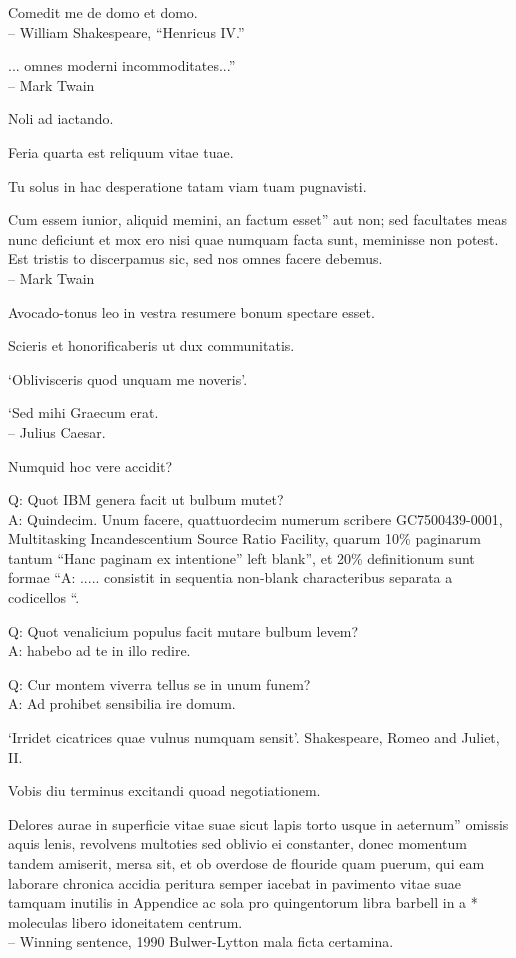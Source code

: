 \documentclass[titlepage,12pt]{memoir}
\begin{document}
Comedit me de domo et domo.
\\-- William Shakespeare, “Henricus IV.”

... omnes moderni incommoditates...”
\\-- Mark Twain

Noli ad iactando.

Feria quarta est reliquum vitae tuae.

Tu solus in hac desperatione tatam viam tuam pugnavisti.

Cum essem iunior, aliquid memini, an factum esset”
aut non; sed facultates meas nunc deficiunt et mox ero
nisi quae numquam facta sunt, meminisse non potest. Est tristis to
discerpamus sic, sed nos omnes facere debemus.
\\-- Mark Twain

Avocado-tonus leo in vestra resumere bonum spectare esset.

 Scieris et honorificaberis ut dux communitatis.

‘Oblivisceris quod unquam me noveris’.

‘Sed mihi Graecum erat.
\\-- Julius Caesar.

Numquid hoc vere accidit?

Q: Quot IBM genera facit ut bulbum mutet?\\
A: Quindecim. Unum facere, quattuordecim numerum scribere
GC7500439-0001, Multitasking Incandescentium Source Ratio Facility,
quarum 10\% paginarum tantum “Hanc paginam ex intentione”
left blank”, et 20\% definitionum sunt formae “A: .....
consistit in sequentia non-blank characteribus separata a codicellos “.

Q: Quot venalicium populus facit mutare bulbum levem?\\
A: habebo ad te in illo redire.

Q: Cur montem viverra tellus se in unum funem?\\
A: Ad prohibet sensibilia ire domum.

‘Irridet cicatrices quae vulnus numquam sensit’.
Shakespeare, Romeo and Juliet, II.

Vobis diu terminus excitandi quoad negotiationem.

Delores aurae in superficie vitae suae sicut lapis torto usque in aeternum”
omissis aquis lenis, revolvens multoties sed oblivio
ei constanter, donec momentum tandem amiserit, mersa sit, et ob
overdose de flouride quam puerum, qui eam laborare chronica
accidia peritura semper iacebat in pavimento vitae suae tamquam inutilis
in Appendice ac sola pro quingentorum libra barbell in a *
moleculas libero idoneitatem centrum.
\\-- Winning sentence, 1990 Bulwer-Lytton mala ficta certamina.
\end{document}
